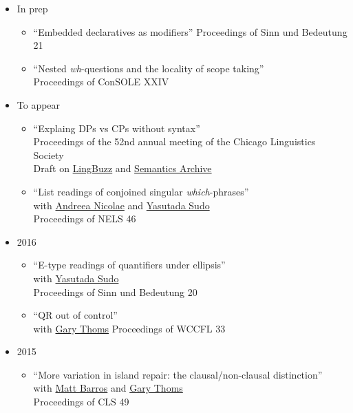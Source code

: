 \documentclass[]{article}
\providecommand{\tightlist}{%
  \setlength{\itemsep}{0pt}\setlength{\parskip}{0pt}}
\begin{document}
\begin{itemize}
\tightlist
\item
  In prep

  \begin{itemize}
  \tightlist
  \item
    ``Embedded declaratives as modifiers'' Proceedings of Sinn und
    Bedeutung 21
  \item
    ``Nested \emph{wh}-questions and the locality of scope taking''\\
    Proceedings of ConSOLE XXIV
  \end{itemize}
\item
  To appear

  \begin{itemize}
  \tightlist
  \item
    ``Explaing DPs vs CPs without syntax''\\
    Proceedings of the 52nd annual meeting of the Chicago Linguistics
    Society\\
    Draft on \href{http://ling.auf.net/lingbuzz/003128}{LingBuzz} and
    \href{http://www.semanticsarchive.net/Archive/zY4NGRlY/}{Semantics
    Archive}
  \item
    ``List readings of conjoined singular \emph{which}-phrases''\\
    with \href{...}{Andreea Nicolae} and \href{...}{Yasutada Sudo}\\
    Proceedings of NELS 46
  \end{itemize}
\item
  2016

  \begin{itemize}
  \tightlist
  \item
    ``E-type readings of quantifiers under ellipsis''\\
    with \href{...}{Yasutada Sudo}\\
    Proceedings of Sinn und Bedeutung 20
  \item
    ``QR out of control''\\
    with \href{...}{Gary Thoms} Proceedings of WCCFL 33
  \end{itemize}
\item
  2015

  \begin{itemize}
  \tightlist
  \item
    ``More variation in island repair: the clausal/non-clausal
    distinction''\\
    with \href{...}{Matt Barros} and \href{...}{Gary Thoms}\\
    Proceedings of CLS 49
  \end{itemize}
\end{itemize}
\end{document}
